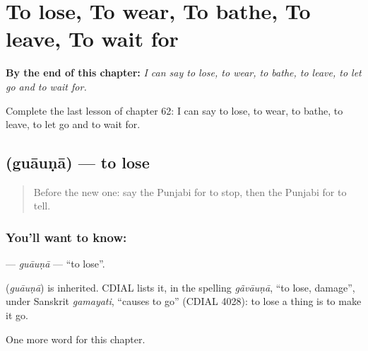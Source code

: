 
\chapter{To lose, To wear, To bathe, To leave, To wait for}
\label{ch:pa-to-lose-to-wear-to-bathe-to-leave-to-wait-for}

\begin{chapteropening}
\textbf{By the end of this chapter:} \emph{I can say to lose, to wear, to bathe, to leave, to let go and to wait for.}

Complete the last lesson of chapter 62: I can say to lose, to wear, to bathe, to leave, to let go and to wait for.
\end{chapteropening}

\section[\texorpdfstring{\pa{ਗੁਆਉਣਾ} (guāuṇā)}{ਗੁਆਉਣਾ (guāuṇā)}]{ (guāuṇā) — to lose}

\label{lesson:PA-C62-guauna}



\begin{quote}
Before the new one: say the Punjabi for to stop, then the Punjabi for to tell.
\end{quote}

\subsection*{You'll want to know: }
\textbf{} — \emph{guāuṇā} — \textquotedblleft{}to lose\textquotedblright{}.

\begin{cousinweb}
\textbf{} (\emph{guāuṇā}) is inherited. CDIAL lists it, in the spelling \emph{gãvāuṇā}, \textquotedblleft{}to lose, damage\textquotedblright{}, under Sanskrit \emph{gamayati}, \textquotedblleft{}causes to go\textquotedblright{} (CDIAL 4028): to lose a thing is to make it go.
\end{cousinweb}

\begin{grammarlens}[title={What you've built}]
One more word for this chapter.
\end{grammarlens}

